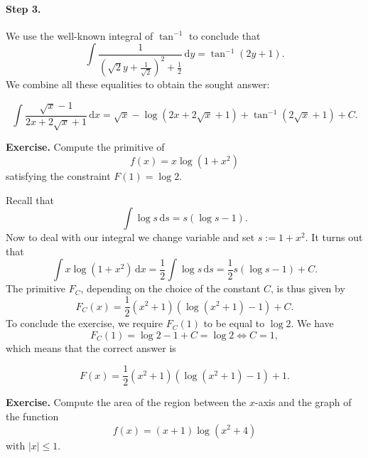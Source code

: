 \documentclass[a4paper,10 pt]{report}
\newcommand{\finalanswer}[1]{%
    \begin{finalAnswer}
    \[
        #1
    \]
    \end{finalAnswer}
}
\theoremstyle{definition}
\begin{document}
\begin{solutionBox}
\paragraph{Step 3.} We use the well-known integral of $\tan^{-1}$ to conclude that
\begin{equation*} \int \frac{1}{\left( \sqrt{2}y + \frac{1}{\sqrt{2}} \right)^2 + \frac{1}{2}} \, \mathrm{d}y = \tan^{-1} \left(2y + 1 \right). \end{equation*}
We combine all these equalities to obtain the sought answer:
\finalanswer{
\int \frac{\sqrt{x} - 1}{2x + 2 \sqrt{x} + 1} \, \mathrm{d}x=  \sqrt{x} - \log(2x + 2 \sqrt{x} + 1) + \tan^{-1}(2 \sqrt{x} + 1) + C.
}
\end{solutionBox}

\begin{exerciseBox} \textbf{Exercise.}  Compute the primitive of
\begin{equation*} f(x) = x \log(1 + x^2) \end{equation*}
satisfying the constraint $F(1) = \log 2$. \end{exerciseBox}

\begin{solutionBox} Recall that
\begin{equation*} \int \log s \, \mathrm{d}s = s ( \log s - 1). \end{equation*}
Now to deal with our integral we change variable and set $s := 1 + x^2$. It turns out that
\begin{equation*} \int x \log(1 + x^2) \, \mathrm{d}x = \frac{1}{2} \int \log s \, \mathrm{d}s = \frac{1}{2}s ( \log s - 1) + C. \end{equation*}
The primitive $F_C$, depending on the choice of the constant $C$, is thus given by
\begin{equation*}F_C(x) = \frac{1}{2}(x^2 + 1) ( \log (x^2 +1) - 1) + C. \end{equation*}
To conclude the exercise, we require $F_C(1)$ to be equal to $\log 2$. We have
\begin{equation*}F_C(1) =  \log 2 - 1 + C = \log 2 \iff C = 1, \end{equation*}
which means that the correct answer is
\finalanswer{
F(x) = \frac{1}{2}(x^2 + 1) ( \log (x^2 +1) - 1) + 1.
}\end{solutionBox}

\begin{exerciseBox} \textbf{Exercise.}  Compute the area of the region between the $x$-axis and the graph of the function
\begin{equation*} f(x) = (x + 1) \log(x^2 + 4) \end{equation*}
with $|x| \leq 1$. \end{exerciseBox}
\end{document}
